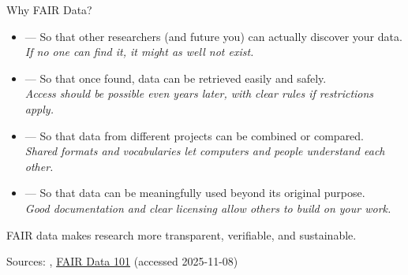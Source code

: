 \documentclass[xetex]{beamer}  %
\begin{document}
\begin{frame}{Why FAIR Data?}
\begin{itemize}
  \item {} — So that other researchers (and future you) can actually discover your data.  
 \\ \quad  \emph{If no one can find it, it might as well not exist.}

  \item {} — So that once found, data can be retrieved easily and safely.  
 \\ \quad \emph{Access should be possible even years later, with clear rules if restrictions apply.}

  \item {} — So that data from different projects can be combined or compared.  
 \\ \quad  \emph{Shared formats and vocabularies let computers and people understand each other.}

  \item {} — So that data can be meaningfully used beyond its original purpose.  
 \\ \quad  \emph{Good documentation and clear licensing allow others to build on your work.}
\end{itemize}

\medskip
FAIR data makes research more transparent, verifiable, and sustainable.

\tiny Sources: \citep{FAIR2016}, 
\href{https://au-research.github.io/FAIR-data-101-training/}{FAIR Data 101} (accessed 2025-11-08)
\end{frame}
\end{document}
